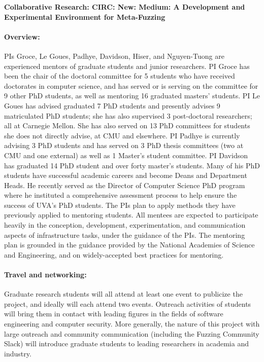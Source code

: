 \documentclass[12pt]{article}
\begin{document}

\begin{center}
{\Large\sf\textbf{Collaborative Research: CIRC: New: Medium: A Development and 
Experimental Environment for Meta-Fuzzing}}
\end{center}


\paragraph{Overview:} PIs Groce, Le Goues, Padhye, Davidson, Hiser, and Nguyen-Tuong are experienced mentors of graduate students and junior researchers. PI Groce has been the chair of the doctoral committee for 5 students who have received doctorates in computer science, and has served or is serving on the committee for 9 other PhD students, as well as mentoring 16 graduated masters' students. PI Le Goues has advised graduated 7 PhD students and presently advises 9 matriculated PhD students; she has also supervised 3 post-doctoral researchers; all at Carnegie Mellon.  She has also served on 13 PhD committees for students she does not directly advise, at CMU and elsewhere. PI Padhye is currently advising 3 PhD students and has served on 3 PhD thesis committees (two at CMU and one external) as well as 1 Master's student committee.
PI Davidson has graduated 14 PhD student and over forty master's students.
Many of his PhD students have successful academic careers and become Deans and Department Heads.
He recently served as the Director of Computer Science PhD program where he instituted a comprehensive assessment process to help ensure the success of UVA's PhD students.  The PIs plan to apply methods they have previously applied to mentoring students. All mentees are expected to participate heavily in the conception, development, experimentation, and communication aspects of infrastructure tasks, under the guidance of the PIs. The mentoring plan is grounded in the guidance provided by the National Academies of Science
and Engineering, and on widely-accepted best practices for mentoring.


\paragraph{Travel and networking:}  Graduate research students will all attend at least one event to  publicize the project, and ideally will each attend two events.  Outreach activities of students will bring them in contact with leading figures in the fields of software engineering and computer security.
More generally, the nature of this project with large outreach and community communication (including the Fuzzing Community Slack) will introduce graduate students to leading researchers in academia and industry.
\end{document}
